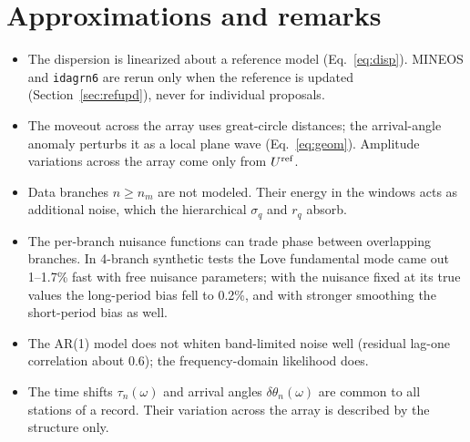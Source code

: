 \documentclass[11pt]{article}
\begin{document}
\section{Approximations and remarks}
\begin{itemize}
\item The dispersion is linearized about a reference model
  (Eq.~\ref{eq:disp}). MINEOS and \texttt{idagrn6} are rerun only when the
  reference is updated (Section~\ref{sec:refupd}), never for individual
  proposals.
\item The moveout across the array uses great-circle distances; the
  arrival-angle anomaly perturbs it as a local plane wave
  (Eq.~\ref{eq:geom}). Amplitude variations across the array come only
  from $U^{\rm ref}$.
\item Data branches $n\ge n_m$ are not modeled. Their energy in the
  windows acts as additional noise, which the hierarchical $\sigma_q$ and
  $r_q$ absorb.
\item The per-branch nuisance functions can trade phase between
  overlapping branches. In 4-branch synthetic tests the Love fundamental
  mode came out 1--1.7\% fast with free nuisance parameters; with the
  nuisance fixed at its true values the long-period bias fell to 0.2\%,
  and with stronger smoothing the short-period bias as well.
\item The AR(1) model does not whiten band-limited noise well (residual
  lag-one correlation about 0.6); the frequency-domain likelihood does.
\item The time shifts $\tau_n(\omega)$ and arrival angles
  $\delta\theta_n(\omega)$ are common to all stations of a record. Their
  variation across the array is described by the structure only.
\end{itemize}

\end{document}

